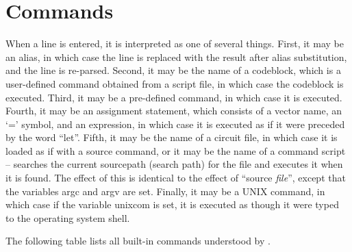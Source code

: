 \chapter{{\WRspice} Commands}
\label{commands}


When a line is entered, it is interpreted as one of several things. 
First, it may be an alias, in which case the line is replaced with the
result after alias substitution, and the line is re-parsed.  Second,
it may be the name of a codeblock, which is a user-defined command
obtained from a script file, in which case the codeblock is executed. 
Third, it may be a pre-defined command, in which case it is executed. 
Fourth, it may be an assignment statement, which consists of a vector
name, an `{\vt =}' symbol, and an expression, in which case it is
executed as if it were preceded by the word ``{\vt let}''.  Fifth, it
may be the name of a circuit file, in which case it is loaded as if
with a {\cb source} command, or it may be the name of a command script
-- {\WRspice} searches the current {\et sourcepath} (search path) for
the file and executes it when it is found.  The effect of this is
identical to the effect of ``{\vt source} {\it file}'', except that
the variables {\et argc} and {\et argv} are set.  Finally, it may be a
UNIX command, in which case if the variable {\et unixcom} is set, it
is executed as though it were typed to the operating system shell.


The following table lists all built-in commands understood by
{\WRspice}.

